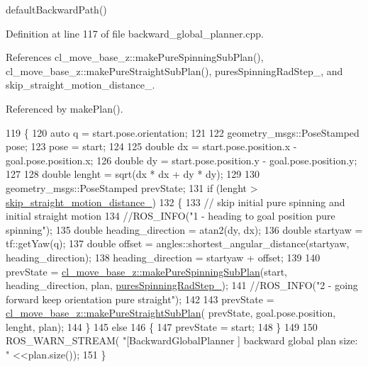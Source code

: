 default\+Backward\+Path() 

Definition at line 117 of file backward\+\_\+global\+\_\+planner.\+cpp.



References cl\+\_\+move\+\_\+base\+\_\+z\+::make\+Pure\+Spinning\+Sub\+Plan(), cl\+\_\+move\+\_\+base\+\_\+z\+::make\+Pure\+Straight\+Sub\+Plan(), pures\+Spinning\+Rad\+Step\+\_\+, and skip\+\_\+straight\+\_\+motion\+\_\+distance\+\_\+.



Referenced by make\+Plan().


\begin{DoxyCode}
119 \{
120     \textcolor{keyword}{auto} q = start.pose.orientation;
121 
122     geometry\_msgs::PoseStamped pose;
123     pose = start;
124     
125     \textcolor{keywordtype}{double} dx = start.pose.position.x - goal.pose.position.x;
126     \textcolor{keywordtype}{double} dy = start.pose.position.y - goal.pose.position.y;
127 
128     \textcolor{keywordtype}{double} lenght = sqrt(dx * dx + dy * dy);
129 
130     geometry\_msgs::PoseStamped prevState;
131     \textcolor{keywordflow}{if} (lenght > \hyperlink{classcl__move__base__z_1_1backward__global__planner_1_1BackwardGlobalPlanner_a045290b931b816b84ced2cfb6c39fcce}{skip\_straight\_motion\_distance\_})
132     \{
133         \textcolor{comment}{// skip initial pure spinning and initial straight motion}
134         \textcolor{comment}{//ROS\_INFO("1 - heading to goal position pure spinning");}
135         \textcolor{keywordtype}{double} heading\_direction = atan2(dy, dx);
136         \textcolor{keywordtype}{double} startyaw = tf::getYaw(q);
137         \textcolor{keywordtype}{double} offset = angles::shortest\_angular\_distance(startyaw, heading\_direction);
138         heading\_direction = startyaw + offset;
139 
140         prevState = \hyperlink{namespacecl__move__base__z_ac774e138510eb7b5e0015be1f7709e19}{cl\_move\_base\_z::makePureSpinningSubPlan}(start, 
      heading\_direction, plan, \hyperlink{classcl__move__base__z_1_1backward__global__planner_1_1BackwardGlobalPlanner_a066d160f78bebee9fc5b5251016f1cd0}{puresSpinningRadStep\_});
141         \textcolor{comment}{//ROS\_INFO("2 - going forward keep orientation pure straight");}
142 
143         prevState = \hyperlink{namespacecl__move__base__z_a1d6998cc28a1847906272f2bf92bacc8}{cl\_move\_base\_z::makePureStraightSubPlan}(
      prevState, goal.pose.position, lenght, plan);
144     \}
145     \textcolor{keywordflow}{else}
146     \{
147         prevState = start;
148     \}
149 
150     ROS\_WARN\_STREAM( \textcolor{stringliteral}{"[BackwardGlobalPlanner ] backward global plan size:  "} <<plan.size());
151 \}
\end{DoxyCode}
